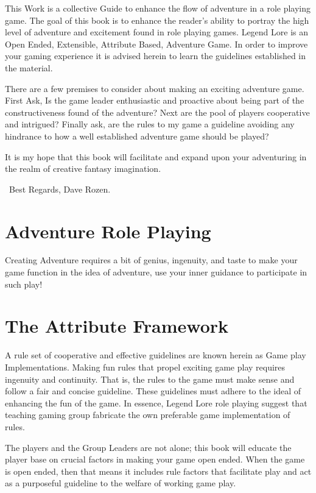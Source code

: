 \documentclass{article}
\begin{document}
This Work is a collective Guide to enhance the flow of adventure in a role playing game. The goal of this book is to enhance the reader's ability to portray the high level of adventure and excitement found in role playing games. Legend Lore is an Open Ended, Extensible, Attribute Based, Adventure Game. In order to improve your gaming experience it is advised herein to learn the guidelines established in the material.

There are a few premises to consider about making an exciting adventure game. First Ask, Is the game leader enthusiastic and proactive about being part of the constructiveness found of the adventure? Next are the pool of players cooperative and intrigued? Finally ask, are the rules to my game a guideline avoiding any hindrance to how a well established adventure game should be played?

It is my hope that this book will facilitate and expand upon your adventuring in the realm of creative fantasy imagination.

~Best Regards, Dave Rozen.

\section{Adventure Role Playing}

Creating Adventure requires a bit of genius, ingenuity, and taste to make your game function in the idea of adventure, use your inner guidance to participate in such play!

\section{The Attribute Framework}

A rule set of cooperative and effective guidelines are known herein as Game play Implementations. Making fun rules that propel exciting game play requires ingenuity and continuity. That is, the rules to the game must make sense and follow a fair and concise guideline. These guidelines must adhere to the ideal of enhancing the fun of the game. In essence, Legend Lore role playing suggest that teaching gaming group fabricate the own preferable game implementation of rules.

The players and the Group Leaders are not alone; this book will educate the player base on crucial factors in making your game open ended. When the game is open ended, then that means it includes rule factors that facilitate play and act as a purposeful guideline to the welfare of working game play.
\end{document}
